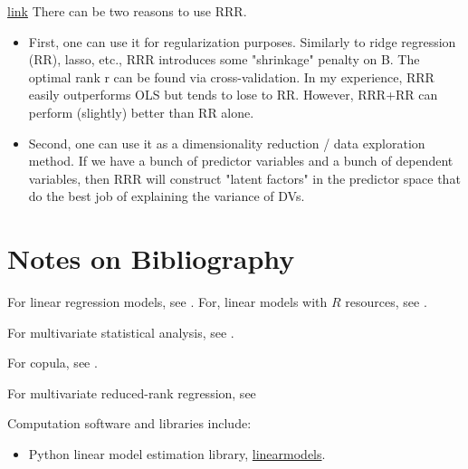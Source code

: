 \begin{refsection}
\begin{remark}\href{https://stats.stackexchange.com/questions/152517/what-is-reduced-rank-regression-all-about}{link}
There can be two reasons to use RRR.
\begin{itemize}
	\item First, one can use it for regularization purposes. Similarly to ridge regression (RR), lasso, etc., RRR introduces some "shrinkage" penalty on B. The optimal rank r can be found via cross-validation. In my experience, RRR easily outperforms OLS but tends to lose to RR. However, RRR+RR can perform (slightly) better than RR alone.
	\item Second, one can use it as a dimensionality reduction / data exploration method. If we have a bunch of predictor variables and a bunch of dependent variables, then RRR will construct "latent factors" in the predictor space that do the best job of explaining the variance of DVs. 	
\end{itemize}
\end{remark}

\section{Notes on Bibliography}

For linear regression models, see \cite{kutner2003applied}\cite{seber2012linear}. For, linear models with $R$ resources, see \cite{faraway2014linear}.


For multivariate statistical analysis, see \cite{johnson2007applied}\cite{anderson2009introduction}.

For copula, see \cite{Ruschendorf2013mathematical}\cite{lindskog2000modelling}\cite{mcneil2015quantitative}\cite{cherubini2004copula}.

For multivariate reduced-rank regression, see \cite{velu1998multivariate}

Computation software and libraries include:
\begin{itemize}
	\item Python linear model estimation library, \href{https://bashtage.github.io/linearmodels/doc/}{linearmodels}.
\end{itemize}

\printbibliography
\end{refsection}
